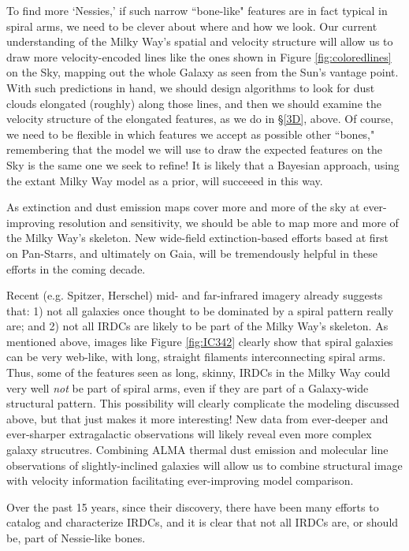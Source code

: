 To find more `Nessies,' if such narrow ``bone-like" features are in fact typical in spiral arms, we need to be clever about where and how we look. Our current understanding of the Milky Way's spatial and velocity structure will allow us to draw more velocity-encoded lines like the ones shown in Figure \ref{fig:coloredlines} on the Sky, mapping out the whole Galaxy as seen from the Sun's vantage point.  With such predictions in hand, we should design algorithms to look for dust clouds elongated (roughly) along those lines, and then we should examine the velocity structure of the elongated features, as we do in \S \ref{3D}, above.   Of course, we need to be flexible in which features we accept as possible other ``bones," remembering that the model we will use to draw the expected features on the Sky is the same one we seek to refine!  It is likely that a Bayesian approach, using the extant Milky Way model as a prior, will succeeed in this way.  

As extinction and dust emission maps cover more and more of the sky at ever-improving resolution and sensitivity, we should be able to map more and more of the Milky Way's skeleton.  New wide-field extinction-based efforts based at first on Pan-Starrs, and ultimately on Gaia, will be tremendously helpful in these efforts in the coming decade.

Recent (e.g. Spitzer, Herschel) mid- and far-infrared imagery already suggests that: 1) not all galaxies once thought to be dominated by a spiral pattern really are; and 2) not all IRDCs are likely to be part of the Milky Way's skeleton.  As mentioned above, images like Figure \ref{fig:IC342} clearly show that spiral galaxies can be very web-like, with long, straight filaments interconnecting spiral arms. Thus, some of the features seen as long, skinny, IRDCs in the Milky Way could very well {\it not} be part of spiral arms, even if they are part of a Galaxy-wide structural pattern.  This possibility will clearly complicate the modeling discussed above, but that just makes it more interesting! New data from ever-deeper and ever-sharper extragalactic observations will likely reveal even more complex galaxy strucutres.  Combining ALMA thermal dust emission and molecular line observations of slightly-inclined galaxies will allow us to combine structural image with velocity information facilitating ever-improving model comparison.

Over the past 15 years, since their discovery, there have been many efforts to catalog and characterize IRDCs, and it is clear that not all IRDCs are, or should be, part of Nessie-like bones.  

